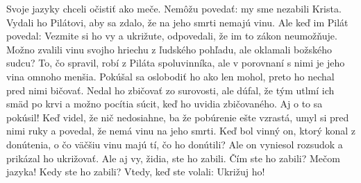 Svoje jazyky chceli očistiť ako meče. Nemôžu povedať: my sme nezabili Krista. Vydali ho Pilátovi, aby sa zdalo, že na jeho smrti nemajú vinu. 
Ale keď im Pilát povedal: Vezmite si ho vy a ukrižute, odpovedali, že im to zákon neumožňuje. Možno zvalili vinu svojho hriechu z ľudského pohľadu, ale oklamali božského sudcu? To, čo spravil, robí z Piláta spoluvinníka, ale v porovnaní s nimi je jeho vina omnoho menšia. Pokúšal sa oslobodiť ho ako len mohol, preto ho nechal pred nimi bičovať. Nedal ho zbičovať zo surovosti, ale dúfal, že tým utlmí ich smäd po krvi a možno pocítia súcit, keď ho uvidia zbičovaného. Aj o to sa pokúsil! Keď videl, že nič nedosiahne, ba že pobúrenie ešte vzrastá, umyl si pred nimi ruky a povedal, že nemá vinu na jeho smrti. 
Keď bol vinný on, ktorý konal z donútenia, o čo väčšiu vinu majú tí, čo ho donútili? Ale on vyniesol rozsudok a prikázal ho ukrižovať. 
Ale aj vy, židia, ste ho zabili. Čím ste ho zabili? Mečom jazyka! Kedy ste ho zabili? Vtedy, keď ste volali: Ukrižuj ho!